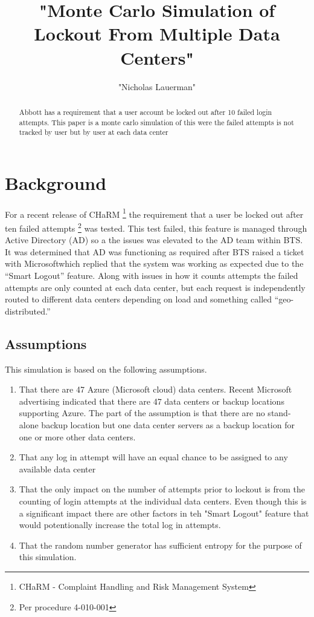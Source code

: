 \documentclass[11pt, letterpaper]{article}
\begin{document}
%



\title{"Monte Carlo Simulation of Lockout From Multiple Data Centers"}
\author{"Nicholas Lauerman"}
\date{}

\begin{abstract}
Abbott has a requirement that a user account be locked out after 10 failed login
attempts. This paper is a monte carlo simulation of this were the failed attempts
is not tracked by user but by user at each data center
\end{abstract}

\tableofcontents
\listoffigures
\listoftables

\section{Background}
For a recent release of CHaRM
\footnote{CHaRM - Complaint Handling and Risk Management System}
the requirement that a user be locked out after ten failed 	attempts
\footnote{Per procedure 4-010-001} was tested. This test failed, this
feature is managed through Active Directory (AD) so a the issues was
elevated to the AD team within BTS. It was determined that AD was
functioning as required after BTS raised a ticket with
Microsoft\texttrademark which replied that the system was working as
expected due to the ``Smart Logout'' feature. Along with issues in how it
counts attempts the failed attempts are only counted at each data center,
but each request is independently routed to different data centers
depending on 	load and something called ``geo-distributed.''

\subsection{Assumptions}
This simulation is based on the following assumptions.
\begin{enumerate}
\item That there are 47 Azure (Microsoft cloud) data centers.
Recent Microsoft advertising indicated that there are 47 data centers
or backup locations supporting Azure. The part of the assumption is
that there are no stand-alone backup location but one data center
servers as a backup location for one or more other data centers.
\item That any log in attempt will have an equal chance to be
assigned to any available data center
\item That the only impact on the number of attempts prior to lockout is
from the counting of login attempts at the individual data centers. Even though
this is a significant impact there are other factors in teh "Smart Logout" feature
that would potentionally increase the total log in attempts.
\item That the random number generator has sufficient entropy for
the purpose of this simulation.
\end{enumerate}
\end{document}
